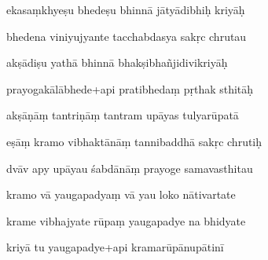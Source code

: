 \documentclass[article,12pt,a4paper]{memoir}%
\newcounter{parCount}
\begin{document}
	  
	  \pstart {} ekasaṃkhyeṣu bhedeṣu bhinnā jātyādibhiḥ kriyāḥ 
	{}
	\pend%
      

	  
	  \pstart \leavevmode%
	bhedena viniyujyante tacchabdasya sakṛc chrutau 
	{}
	\pend%
      

	  
	  \pstart {} akṣādiṣu yathā bhinnā bhakṣibhañjidivikriyāḥ 
	{}
	\pend%
      

	  
	  \pstart \leavevmode%
	prayogakālābhede+api pratibhedaṃ pṛthak sthitāḥ 
	{}
	\pend%
      

	  
	  \pstart {} akṣāṇāṃ tantriṇāṃ tantram upāyas tulyarūpatā 
	{}
	\pend%
      

	  
	  \pstart \leavevmode%
	eṣāṃ kramo vibhaktānāṃ tannibaddhā sakṛc chrutiḥ 
	{}
	\pend%
      

	  
	  \pstart {} dvāv apy upāyau śabdānāṃ prayoge samavasthitau 
	{}
	\pend%
      

	  
	  \pstart \leavevmode%
	kramo vā yaugapadyaṃ vā yau loko nātivartate 
	{}
	\pend%
      

	  
	  \pstart {} krame vibhajyate rūpaṃ yaugapadye na bhidyate 
	{}
	\pend%
      

	  
	  \pstart \leavevmode%
	kriyā tu yaugapadye+api kramarūpānupātinī 
	{}
	\pend%
      
\end{document}
